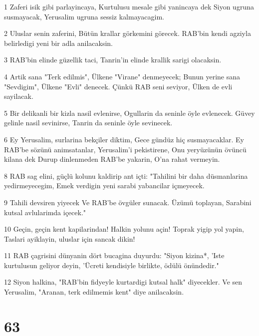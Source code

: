 \par 1 Zaferi isik gibi parlayincaya, Kurtulusu mesale gibi yanincaya dek Siyon ugruna susmayacak, Yerusalim ugruna sessiz kalmayacagim.
\par 2 Uluslar senin zaferini, Bütün krallar görkemini görecek. RAB'bin kendi agziyla belirledigi yeni bir adla anilacaksin.
\par 3 RAB'bin elinde güzellik taci, Tanrin'in elinde krallik sarigi olacaksin.
\par 4 Artik sana "Terk edilmis", Ülkene "Virane" denmeyecek; Bunun yerine sana "Sevdigim", Ülkene "Evli" denecek. Çünkü RAB seni seviyor, Ülken de evli sayilacak.
\par 5 Bir delikanli bir kizla nasil evlenirse, Ogullarin da seninle öyle evlenecek. Güvey gelinle nasil sevinirse, Tanrin da seninle öyle sevinecek.
\par 6 Ey Yerusalim, surlarina bekçiler diktim, Gece gündüz hiç susmayacaklar. Ey RAB'be sözünü animsatanlar, Yerusalim'i pekistirene, Onu yeryüzünün övüncü kilana dek Durup dinlenmeden RAB'be yakarin, O'na rahat vermeyin.
\par 8 RAB sag elini, güçlü kolunu kaldirip ant içti: "Tahilini bir daha düsmanlarina yedirmeyecegim, Emek verdigin yeni sarabi yabancilar içmeyecek.
\par 9 Tahili devsiren yiyecek Ve RAB'be övgüler sunacak. Üzümü toplayan, Sarabini kutsal avlularimda içecek."
\par 10 Geçin, geçin kent kapilarindan! Halkin yolunu açin! Toprak yigip yol yapin, Taslari ayiklayin, uluslar için sancak dikin!
\par 11 RAB çagrisini dünyanin dört bucagina duyurdu: "Siyon kizina*, 'Iste kurtulusun geliyor deyin, 'Ücreti kendisiyle birlikte, ödülü önündedir."
\par 12 Siyon halkina, "RAB'bin fidyeyle kurtardigi kutsal halk" diyecekler. Ve sen Yerusalim, "Aranan, terk edilmemis kent" diye anilacaksin.

\chapter{63}

